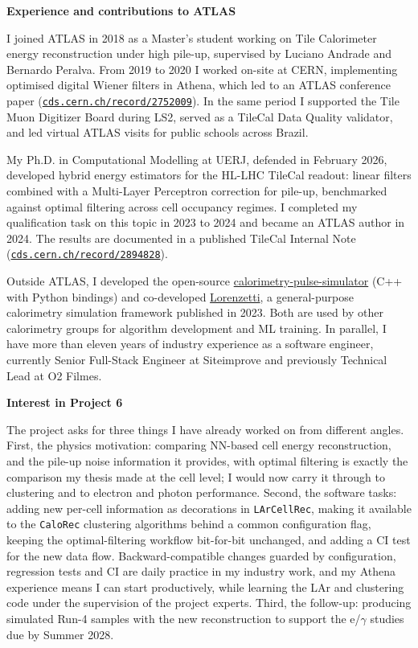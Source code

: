 \documentclass[11pt,a4paper]{article}
\begin{document}
\textbf{\color{SlateGrey}Experience and contributions to ATLAS}

I joined ATLAS in 2018 as a Master's student working on Tile Calorimeter energy reconstruction under high pile-up, supervised by Luciano Andrade and Bernardo Peralva. From 2019 to 2020 I worked on-site at CERN, implementing optimised digital Wiener filters in Athena, which led to an ATLAS conference paper (\href{https://cds.cern.ch/record/2752009/}{\nolinkurl{cds.cern.ch/record/2752009}}). In the same period I supported the Tile Muon Digitizer Board during LS2, served as a TileCal Data Quality validator, and led virtual ATLAS visits for public schools across Brazil.

My Ph.D. in Computational Modelling at UERJ, defended in February 2026, developed hybrid energy estimators for the HL-LHC TileCal readout: linear filters combined with a Multi-Layer Perceptron correction for pile-up, benchmarked against optimal filtering across cell occupancy regimes. I completed my qualification task on this topic in 2023 to 2024 and became an ATLAS author in 2024. The results are documented in a published TileCal Internal Note (\href{https://cds.cern.ch/record/2894828/}{\nolinkurl{cds.cern.ch/record/2894828}}).

Outside ATLAS, I developed the open-source \href{https://github.com/ingoncalves/calorimetry-pulse-simulator}{calorimetry-pulse-simulator} (C++ with Python bindings) and co-developed \href{https://github.com/lorenzetti-ufrj-br/lorenzetti}{Lorenzetti}, a general-purpose calorimetry simulation framework published in 2023. Both are used by other calorimetry groups for algorithm development and ML training. In parallel, I have more than eleven years of industry experience as a software engineer, currently Senior Full-Stack Engineer at Siteimprove and previously Technical Lead at O2 Filmes.

\textbf{\color{SlateGrey}Interest in Project 6}

The project asks for three things I have already worked on from different angles. First, the physics motivation: comparing NN-based cell energy reconstruction, and the pile-up noise information it provides, with optimal filtering is exactly the comparison my thesis made at the cell level; I would now carry it through to clustering and to electron and photon performance. Second, the software tasks: adding new per-cell information as decorations in \texttt{LArCellRec}, making it available to the \texttt{CaloRec} clustering algorithms behind a common configuration flag, keeping the optimal-filtering workflow bit-for-bit unchanged, and adding a CI test for the new data flow. Backward-compatible changes guarded by configuration, regression tests and CI are daily practice in my industry work, and my Athena experience means I can start productively, while learning the LAr and clustering code under the supervision of the project experts. Third, the follow-up: producing simulated Run-4 samples with the new reconstruction to support the e/$\gamma$ studies due by Summer 2028.
\end{document}
